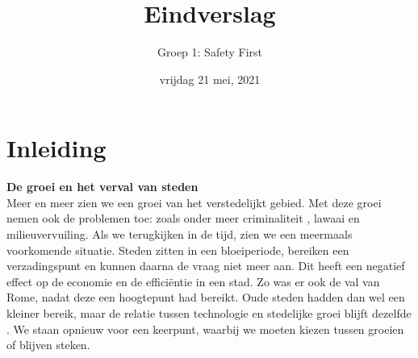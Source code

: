\documentclass[a4paper,kulak]{kulakarticle}
\title{Eindverslag}
\author{Groep 1: Safety First}
\date{vrijdag 21 mei, 2021}
\begin{document}
\maketitle
\tableofcontents

\newpage

\section{Inleiding}

\textbf{\large De groei en het verval van steden} \\
Meer en meer zien we een groei van het verstedelijkt gebied. Met deze groei nemen ook de problemen toe: zoals onder meer criminaliteit \cite{crimi}, lawaai \cite{lawaai} en milieuvervuiling\cite{milieu}. Als we terugkijken in de tijd, zien we een meermaals voorkomende situatie. Steden zitten in een bloeiperiode, bereiken een verzadingspunt en kunnen daarna de vraag niet meer aan. Dit heeft een negatief effect op de economie en de efficiëntie in een stad. Zo was er ook de val van Rome, nadat deze een hoogtepunt had bereikt. Oude steden hadden dan wel een kleiner bereik, maar de relatie tussen technologie en stedelijke groei blijft dezelfde \cite{smartcities} . We staan opnieuw voor een keerpunt, waarbij we moeten kiezen tussen groeien of blijven steken.
\end{document}

